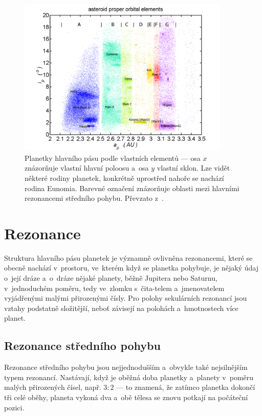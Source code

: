 \documentclass[A4paper, 12pt, oneside, openany]{book}
\begin{document}
\begin{figure}
	\centering
	\includegraphics[width=0.9\textwidth]{obr/mainbelt.png}
	\caption{Planetky hlavního pásu podle vlastních elementů --- osa $x$ znázorňuje vlastní hlavní poloosu a~osa $y$ vlastní sklon. Lze vidět některé rodiny planetek, konkrétně uprostřed nahoře se nachází rodina Eunomia. Barevné označení znázorňuje oblasti mezi hlavními rezonancemi středního pohybu. Převzato z~\cite{wiki:belt}.} \label{fig:belt}
\end{figure}

\pagebreak
\section{Rezonance}
Struktura hlavního pásu planetek je významně ovlivněna rezonancemi, které se obecně nachází v~prostoru, ve~kterém když se planetka pohybuje, je nějaký údaj o~její dráze a~o~dráze nějaké planety, běžně Jupitera nebo Saturnu, v~jednoduchém poměru, tedy ve~zlomku s~čita-telem a~jmenovatelem vyjádřenými malými přirozenými čísly. Pro polohy sekulárních rezonancí jsou vztahy podstatně složitější, neboť závisejí na polohách a~hmotnostech více planet.
\subsection{Rezonance středního pohybu} \label{sec:meanmotion}

Rezonance středního pohybu jsou nejjednodušším a~obvykle také nejsilnějším typem rezonancí. Nastávají, když je oběžná doba planetky a~planety v~poměru malých přirozených čísel, např. $3:2$ --- to znamená, že zatímco planetka dokončí tři celé oběhy, planeta vykoná dva a~obě tělesa se znovu potkají na počáteční pozici. 
\end{document}
